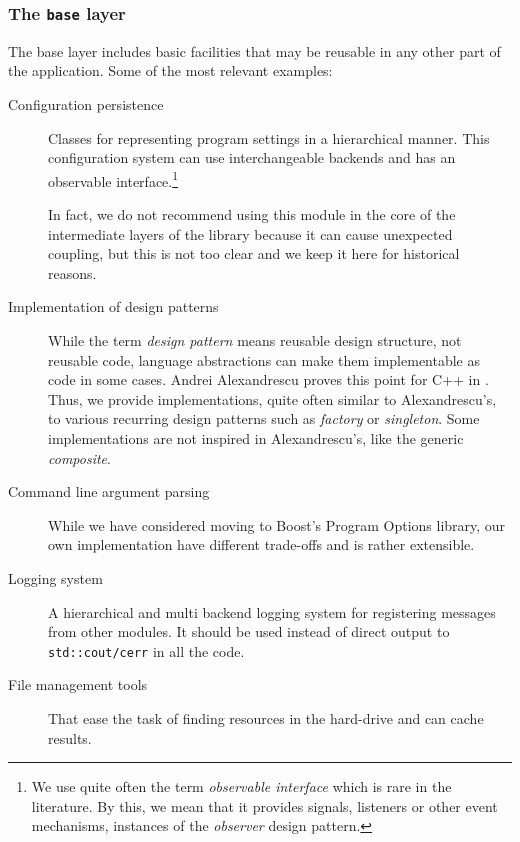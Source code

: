 \subsubsection{The \texttt{base} layer}

The base layer includes basic facilities that may be reusable in any
other part of the application. Some of the most relevant examples:

\begin{description}
\item[Configuration persistence] Classes for representing program
  settings in a hierarchical manner. This configuration system can use
  interchangeable backends and has an observable
  interface.\footnote{We use quite often the term \emph{observable
      interface} which is rare in the literature. By this, we mean
    that it provides signals, listeners or other event mechanisms,
    instances of the \emph{observer} design
    pattern\cite{gamma95design}.}

  In fact, we do not recommend using this module in the core of the
  intermediate layers of the library because it can cause unexpected
  coupling, but this is not too clear and we keep it here for
  historical reasons.

\item[Implementation of design patterns] While the term \emph{design
    pattern} means reusable design structure, not reusable code,
  language abstractions can make them implementable as code in some
  cases. Andrei Alexandrescu proves this point for C++ in
  \cite{alexandrescu01modern}. Thus, we provide implementations, quite
  often similar to Alexandrescu's, to various recurring design
  patterns such as \emph{factory} or \emph{singleton}. Some
  implementations are not inspired in Alexandrescu's, like the generic
  \emph{composite}.

\item[Command line argument parsing] While we have considered moving
  to Boost's Program Options library, our own implementation have
  different trade-offs and is rather extensible.

\item[Logging system] A hierarchical and multi backend logging system
  for registering messages from other modules. It should be used
  instead of direct output to \texttt{std::cout/cerr} in all the code.

\item[File management tools] That ease the task of finding resources
  in the hard-drive and can cache results.
\end{description}

